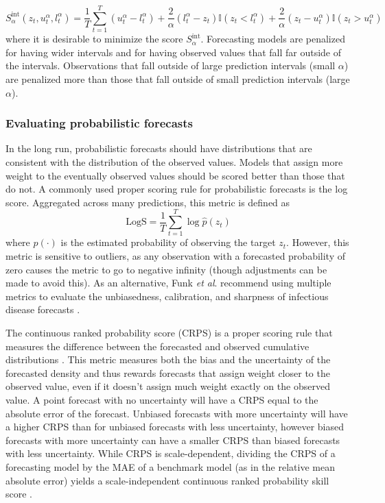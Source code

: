 \documentclass[a4paper]{article}
\newcommand{\etalspace}{\textit{et al}. }
\begin{document}
$$
S^{\text{int}}_\alpha (z_t, u^\alpha_t, l^\alpha_t) = \frac{1}{T}\sum_{t=1}^T (u^\alpha_t-l^\alpha_t) + \frac{2}{\alpha} (l^\alpha_t-z_t) \mathbb{I} (z_t<l^\alpha_t) + \frac{2}{\alpha} (z_t-u^\alpha_t) \mathbb{I} (z_t>u^\alpha_t)
$$
where it is desirable to minimize the score $S^{\text{int}}_\alpha$.
Forecasting models are penalized for having wider intervals and for having observed values that fall far outside of the intervals.
Observations that fall outside of large prediction intervals (small $\alpha$) are penalized more than those that fall outside of small prediction intervals (large $\alpha$).

\subsubsection{Evaluating probabilistic forecasts}

In the long run, probabilistic forecasts should have distributions that are consistent with the distribution of the observed values. 
Models that assign more weight to the eventually observed values should be scored better than those that do not.\cite{Gneiting2007}
A commonly used proper scoring rule for probabilistic forecasts is the log score. Aggregated across many predictions, this metric is defined as 
$$\text{LogS}=\frac{1}{T}\sum_{t=1}^T\log \hat p(z_t)$$
where $\hat p(\cdot)$ is the estimated probability of observing the target $z_t$.
However, this metric is sensitive to outliers, as any observation with a forecasted probability of zero causes the metric to go to negative infinity (though adjustments can be made to avoid this).
As an alternative, Funk \etalspace recommend using multiple metrics to evaluate the unbiasedness, calibration, and sharpness of infectious disease forecasts \cite{Funk2017}.

The continuous ranked probability score (CRPS) is a proper scoring rule that measures the difference between the forecasted and observed cumulative distributions \cite{Hersbach2000}.
This metric measures both the bias and the uncertainty of the forecasted density and thus rewards forecasts that assign weight closer to the observed value, even if it doesn't assign much weight exactly on the observed value.
A point forecast with no uncertainty will have a CRPS equal to the absolute error of the forecast.
Unbiased forecasts with more uncertainty will have a higher CRPS than for unbiased forecasts with less uncertainty, however biased forecasts with more uncertainty can have a smaller CRPS than biased forecasts with less uncertainty.
While CRPS is scale-dependent, dividing the CRPS of a forecasting model by the MAE of a benchmark model (as in the relative mean absolute error) yields a scale-independent continuous ranked probability skill score \cite{Bradley2011,Bogner2018}.
\end{document}
